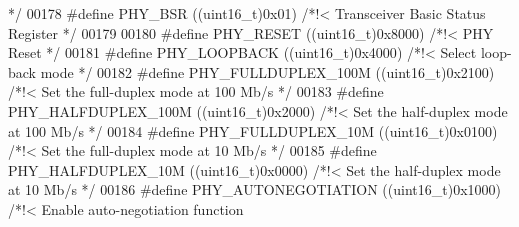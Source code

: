 \begin{DoxyCode}
{       */}
00178 \textcolor{preprocessor}{#}\textcolor{preprocessor}{define} \textcolor{preprocessor}{PHY\_BSR}                         \textcolor{preprocessor}{(}\textcolor{preprocessor}{(}\textcolor{preprocessor}{uint16\_t}\textcolor{preprocessor}{)}0x01\textcolor{preprocessor}{)}    \textcolor{comment}{/*!< Transceiver Basic Status Register   
       */}
00179 
00180 \textcolor{preprocessor}{#}\textcolor{preprocessor}{define} \textcolor{preprocessor}{PHY\_RESET}                       \textcolor{preprocessor}{(}\textcolor{preprocessor}{(}\textcolor{preprocessor}{uint16\_t}\textcolor{preprocessor}{)}0x8000\textcolor{preprocessor}{)}  \textcolor{comment}{/*!< PHY Reset */}
00181 \textcolor{preprocessor}{#}\textcolor{preprocessor}{define} \textcolor{preprocessor}{PHY\_LOOPBACK}                    \textcolor{preprocessor}{(}\textcolor{preprocessor}{(}\textcolor{preprocessor}{uint16\_t}\textcolor{preprocessor}{)}0x4000\textcolor{preprocessor}{)}  \textcolor{comment}{/*!< Select loop-back mode */}
00182 \textcolor{preprocessor}{#}\textcolor{preprocessor}{define} \textcolor{preprocessor}{PHY\_FULLDUPLEX\_100M}             \textcolor{preprocessor}{(}\textcolor{preprocessor}{(}\textcolor{preprocessor}{uint16\_t}\textcolor{preprocessor}{)}0x2100\textcolor{preprocessor}{)}  \textcolor{comment}{/*!< Set the full-duplex mode at 100 Mb/s
       */}
00183 \textcolor{preprocessor}{#}\textcolor{preprocessor}{define} \textcolor{preprocessor}{PHY\_HALFDUPLEX\_100M}             \textcolor{preprocessor}{(}\textcolor{preprocessor}{(}\textcolor{preprocessor}{uint16\_t}\textcolor{preprocessor}{)}0x2000\textcolor{preprocessor}{)}  \textcolor{comment}{/*!< Set the half-duplex mode at 100 Mb/s
       */}
00184 \textcolor{preprocessor}{#}\textcolor{preprocessor}{define} \textcolor{preprocessor}{PHY\_FULLDUPLEX\_10M}              \textcolor{preprocessor}{(}\textcolor{preprocessor}{(}\textcolor{preprocessor}{uint16\_t}\textcolor{preprocessor}{)}0x0100\textcolor{preprocessor}{)}  \textcolor{comment}{/*!< Set the full-duplex mode at 10 Mb/s 
       */}
00185 \textcolor{preprocessor}{#}\textcolor{preprocessor}{define} \textcolor{preprocessor}{PHY\_HALFDUPLEX\_10M}              \textcolor{preprocessor}{(}\textcolor{preprocessor}{(}\textcolor{preprocessor}{uint16\_t}\textcolor{preprocessor}{)}0x0000\textcolor{preprocessor}{)}  \textcolor{comment}{/*!< Set the half-duplex mode at 10 Mb/s 
       */}
00186 \textcolor{preprocessor}{#}\textcolor{preprocessor}{define} \textcolor{preprocessor}{PHY\_AUTONEGOTIATION}             \textcolor{preprocessor}{(}\textcolor{preprocessor}{(}\textcolor{preprocessor}{uint16\_t}\textcolor{preprocessor}{)}0x1000\textcolor{preprocessor}{)}  \textcolor{comment}{/*!< Enable auto-negotiation function    
}
\end{DoxyCode}
